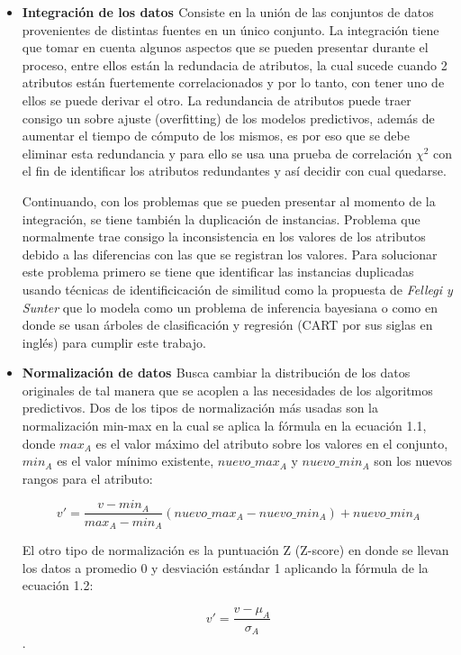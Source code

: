\begin{itemize}
\item \textbf{Integración de los datos \cite{garcia2016data,batini1986comparative}}
Consiste en la unión de las conjuntos de datos provenientes de distintas fuentes en un único conjunto. La integración tiene que tomar en cuenta algunos aspectos que se pueden presentar durante el proceso, entre ellos están la redundacia de atributos, la cual sucede cuando 2 atributos están fuertemente correlacionados y por lo tanto, con tener uno de ellos se puede derivar el otro. La redundancia de atributos puede traer consigo un sobre ajuste (overfitting) de los modelos predictivos, además de aumentar el tiempo de cómputo de los mismos, es por eso que se debe eliminar esta redundancia y para ello se usa una prueba de correlación $\chi^2$ con el fin de identificar los atributos redundantes y así decidir con cual quedarse. 

Continuando, con los problemas que se pueden presentar al momento de la integración, se tiene también la duplicación de instancias. Problema que normalmente trae consigo la inconsistencia en los valores de los atributos debido a las diferencias con las que se registran los valores. Para solucionar este problema primero se tiene que identificar las instancias duplicadas usando técnicas de identificicación de similitud como la propuesta de \emph{Fellegi y Sunter} \cite{fellegi1969theory} que lo modela como un problema de inferencia bayesiana o como en \cite{cochinwala2001efficient} donde se usan árboles de clasificación y regresión (CART por sus siglas en inglés) para cumplir este trabajo.

\item \textbf{Normalización de datos \cite{garcia2016data}}
Busca cambiar la distribución de los datos originales de tal manera que se acoplen a las necesidades de los algoritmos predictivos. Dos de los tipos de normalización más usadas son la normalización min-max en la cual se aplica la fórmula en la ecuación 1.1, donde $max_A$ es el valor máximo del atributo sobre los valores en el conjunto, $min_A$ es el valor mínimo existente, $nuevo\_max_A$ y $nuevo\_min_A$ son los nuevos rangos para el atributo:

\begin{equation}
v' = \frac{v-min_A}{max_A-min_A}(nuevo\_max_A - nuevo\_min_A) + nuevo\_min_A
\end{equation}

El otro tipo de normalización es la puntuación Z (Z-score) en donde se llevan los datos a promedio 0 y desviación estándar 1 aplicando la fórmula de la ecuación 1.2:

\begin{equation}
v' = \frac{v-\mu_A}{\sigma_A}
\end{equation}
.\end{itemize}


